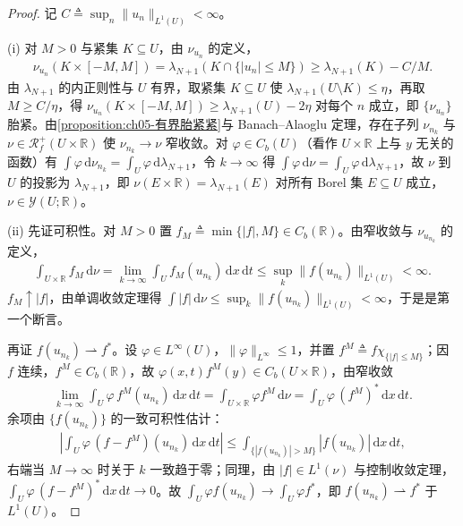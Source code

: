 \documentclass[../main.tex]{subfiles}
\begin{document}
\begin{proof}
记 $C\triangleq\sup_n\|u_n\|_{L^1(U)}<\infty$。

(i) 对 $M>0$ 与紧集 $K\subseteq U$，由 $\nu_{u_n}$ 的定义，
\begin{align*}
\nu_{u_n}(K\times[-M,M])=\lambda_{N+1}(K\cap\{|u_n|\leqslant M\})
\geqslant\lambda_{N+1}(K)-C/M.
\end{align*}
由 $\lambda_{N+1}$ 的内正则性与 $U$ 有界，取紧集 $K\subseteq U$ 使 $\lambda_{N+1}(U\setminus K)\leqslant\eta$，再取 $M\geqslant C/\eta$，得 $\nu_{u_n}(K\times[-M,M])\geqslant\lambda_{N+1}(U)-2\eta$ 对每个 $n$ 成立，即 $\{\nu_{u_n}\}$ 胎紧。由\cref{proposition:ch05-有界胎紧紧}与 Banach--Alaoglu 定理，存在子列 $\nu_{n_k}$ 与 $\nu\in\mathscr{R}^+_f(U\times\mathbb{R})$ 使 $\nu_{n_k}\to\nu$ 窄收敛。对 $\varphi\in C_b(U)$（看作 $U\times\mathbb{R}$ 上与 $y$ 无关的函数）有 $\int\varphi\,\mathrm{d}\nu_{n_k}=\int_U\varphi\,\mathrm{d}\lambda_{N+1}$，令 $k\to\infty$ 得 $\int\varphi\,\mathrm{d}\nu=\int_U\varphi\,\mathrm{d}\lambda_{N+1}$，故 $\nu$ 到 $U$ 的投影为 $\lambda_{N+1}$，即 $\nu(E\times\mathbb{R})=\lambda_{N+1}(E)$ 对所有 Borel 集 $E\subseteq U$ 成立，$\nu\in\mathcal{Y}(U;\mathbb{R})$。

(ii) 先证可积性。对 $M>0$ 置 $f_M\triangleq\min\{|f|,M\}\in C_b(\mathbb{R})$。由窄收敛与 $\nu_{u_{n_k}}$ 的定义，
\begin{align*}
\int_{U\times\mathbb{R}}f_M\,\mathrm{d}\nu
=\lim_{k\to\infty}\int_U f_M(u_{n_k})\,\mathrm{d}x\,\mathrm{d}t
\leqslant\sup_k\|f(u_{n_k})\|_{L^1(U)}<\infty .
\end{align*}
$f_M\uparrow|f|$，由单调收敛定理得 $\int|f|\,\mathrm{d}\nu\leqslant\sup_k\|f(u_{n_k})\|_{L^1(U)}<\infty$，于是是第一个断言。

再证 $f(u_{n_k})\rightharpoonup f^*$。设 $\varphi\in L^\infty(U)$，$\|\varphi\|_{L^\infty}\leqslant1$，并置 $f^M\triangleq f\chi_{\{|f|\leqslant M\}}$；因 $f$ 连续，$f^M\in C_b(\mathbb{R})$，故 $\varphi(x,t)f^M(y)\in C_b(U\times\mathbb{R})$，由窄收敛
\begin{align*}
\lim_{k\to\infty}\int_U\varphi\,f^M(u_{n_k})\,\mathrm{d}x\,\mathrm{d}t
=\int_{U\times\mathbb{R}}\varphi f^M\,\mathrm{d}\nu
=\int_U\varphi\,(f^M)^*\,\mathrm{d}x\,\mathrm{d}t .
\end{align*}
余项由 $\{f(u_{n_k})\}$ 的一致可积性估计：
\begin{align*}
\left|\int_U\varphi\,(f-f^M)(u_{n_k})\,\mathrm{d}x\,\mathrm{d}t\right|
\leqslant\int_{\{|f(u_{n_k})|>M\}}|f(u_{n_k})|\,\mathrm{d}x\,\mathrm{d}t,
\end{align*}
右端当 $M\to\infty$ 时关于 $k$ 一致趋于零；同理，由 $|f|\in L^1(\nu)$ 与控制收敛定理，$\int_U\varphi\,(f-f^M)^*\,\mathrm{d}x\,\mathrm{d}t\to0$。故 $\int_U\varphi f(u_{n_k})\to\int_U\varphi f^*$，即 $f(u_{n_k})\rightharpoonup f^*$ 于 $L^1(U)$。


\end{proof}
\end{document}
